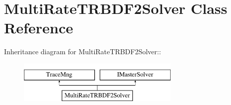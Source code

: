 \hypertarget{classMultiRateTRBDF2Solver}{
\section{MultiRateTRBDF2Solver Class Reference}
\label{classMultiRateTRBDF2Solver}
}
Inheritance diagram for MultiRateTRBDF2Solver::\begin{figure}[H]
\begin{center}
\leavevmode
\includegraphics[height=2cm]{classMultiRateTRBDF2Solver}
\end{center}
\end{figure}
